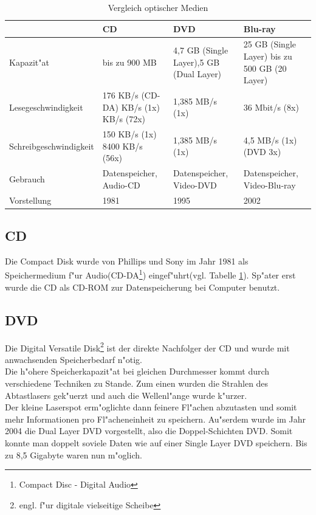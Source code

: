         
{%
\label{ch:Technisch:sec:Optische SpeicherungM}     
\begin{table}[ht]
\small
\begin{tabular}{|p{3.8cm}|p{3.2cm}|p{3cm}|p{3cm}|}
\hline
~ & CD & DVD & Blu-ray \\ \hline
Kapazit"at & bis zu 900 MB & 4,7 GB (Single Layer)\newline 8,5 GB (Dual Layer)  & 25 GB (Single Layer) bis zu 500 GB (20 Layer) \\  \hline
Lesegeschwindigkeit & 176 KB/s (CD-DA)\newline 150 KB/s (1x) \newline 10800 KB/s (72x) & 1,385 MB/s (1x) & 36 Mbit/s (8x) \\ \hline
Schreibgeschwindigkeit & 150 KB/s (1x)  8400 KB/s (56x) & 1,385 MB/s (1x) & 4,5 MB/s (1x) (DVD 3x) \\ \hline
Gebrauch & Datenspeicher, Audio-CD & Datenspeicher, Video-DVD & Datenspeicher, Video-Blu-ray \\ \hline
Vorstellung & 1981 & 1995 & 2002 \\
\hline
\end{tabular}
\caption{Vergleich optischer Medien}
\label{tab:vlgOptMed}
\end{table}
}%


        \subsection{CD}
        \label{ch:Technisch:sec:Optische Speicherung:sub:CD}
        
            Die Compact Disk wurde von Phillips und Sony im Jahr 1981 als Speichermedium f"ur Audio(CD-DA\footnote{Compact Disc - Digital Audio}) eingef"uhrt(vgl. Tabelle \ref{tab:vlgOptMed}). Sp"ater erst wurde die CD als CD-ROM zur Datenspeicherung bei Computer benutzt. 
        
        \subsection{DVD}
        \label{ch:Technisch:sec:Optische Speicherung:sub:DVD}
        
            Die Digital Versatile Disk\footnote{engl. f"ur digitale vielseitige Scheibe} ist der direkte Nachfolger der CD und wurde mit anwachsenden Speicherbedarf n"otig. 
            \\
            Die h"ohere Speicherkapazit"at bei gleichen Durchmesser kommt durch verschiedene Techniken zu Stande. Zum einen wurden die Strahlen des Abtastlasers gek"uerzt und auch die Wellenl"ange wurde k"urzer. 
			\\
			Der kleine Laserspot erm"oglichte dann feinere Fl"achen abzutasten und somit mehr Informationen pro Fl"acheneinheit zu speichern. Au"serdem wurde im Jahr 2004 die Dual Layer DVD vorgestellt, also die \glqq Doppel-Schichten DVD\grqq{}. Somit konnte man doppelt soviele Daten wie auf einer Single Layer DVD speichern. Bis zu 8,5 Gigabyte waren nun m"oglich.
        
